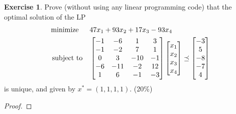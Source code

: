 \documentclass[12pt]{extarticle}
\theoremstyle{definition}
\newtheorem{exercise}{Exercise}
\begin{document}
\begin{exercise}
  Prove (without using any linear programming code) that the optimal solution of the LP
  \begin{align*}
    \text{minimize\;\;}\quad&47x_1+93x_2+17x_3-93x_4\\
    \text{subject to}  \quad&
      \begin{bmatrix}
        -1 & -6 & 1 & 3\\
        -1 & -2 & 7 & 1\\
        0 & 3 & -10 & -1\\
        -6 & -11 & -2 & 12\\
        1 & 6 & -1 & -3
      \end{bmatrix}
      \begin{bmatrix}
        x_1\\x_2\\x_3\\x_4
      \end{bmatrix}\preceq
      \begin{bmatrix}
        -3\\5\\-8\\-7\\4
      \end{bmatrix}
  \end{align*}
  is unique, and given by $x^\ast=(1,1,1,1)$. (20\%)
\end{exercise}
\begin{proof}
\end{proof}
\end{document}
